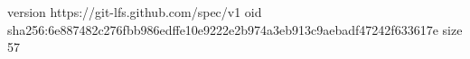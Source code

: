 version https://git-lfs.github.com/spec/v1
oid sha256:6e887482c276fbb986edffe10e9222e2b974a3eb913c9aebadf47242f633617e
size 57
